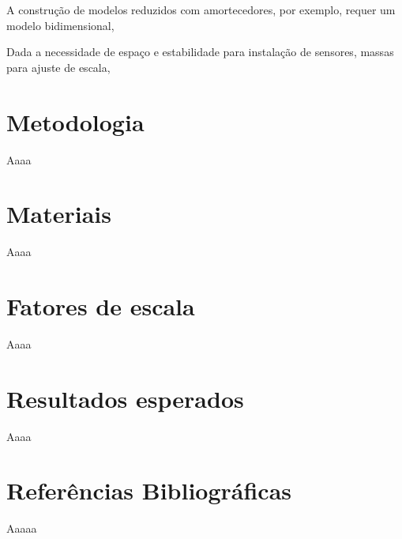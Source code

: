 A construção de modelos reduzidos com amortecedores, por exemplo, requer um modelo bidimensional, 

Dada a necessidade de espaço e estabilidade para instalação de sensores, massas para ajuste de escala, 



\section{Metodologia}
Aaaa


\section{Materiais}
Aaaa


\section{Fatores de escala}
Aaaa


\section{Resultados esperados}
Aaaa


\section{Referências Bibliográficas}
Aaaaa
    



